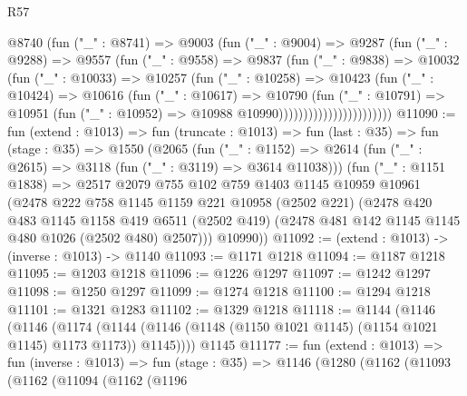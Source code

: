\begin{lexlean}{R57}
\begin{coremodule}
                          @8740
                            (fun ("_" : @8741) =>
                            @9003
                              (fun ("_" : @9004) =>
                              @9287
                                (fun ("_" : @9288) =>
                                @9557
                                  (fun ("_" : @9558) =>
                                  @9837
                                    (fun ("_" : @9838) =>
                                    @10032
                                      (fun ("_" : @10033) =>
                                      @10257
                                        (fun ("_" : @10258) =>
                                        @10423
                                          (fun ("_" : @10424) =>
                                          @10616
                                            (fun ("_" : @10617) =>
                                            @10790
                                              (fun ("_" : @10791) =>
                                              @10951
                                                (fun ("_" : @10952) =>
                                                @10988 @10990)))))))))))))))))))))))
@11090 := fun (extend : @1013) =>
  fun (truncate : @1013) =>
  fun (last : @35) =>
  fun (stage : @35) =>
  @1550
    (@2065
      (fun ("_" : @1152) => @2614 (fun ("_" : @2615) => @3118 (fun ("_" : @3119) => @3614 @11038)))
      (fun ("_" : @1151 @1838) =>
      @2517
        @2079
        @755
        @102
        @759
        @1403
        @1145
        @10959
        @10961
        (@2478
          @222
          @758
          @1145
          @1159
          @221
          @10958
          (@2502 @221)
          (@2478
            @420
            @483
            @1145
            @1158
            @419
            @6511
            (@2502 @419)
            (@2478 @481 @142 @1145 @1145 @480 @1026 (@2502 @480) @2507)))
        @10990))
@11092 := (extend : @1013) -> (inverse : @1013) -> @1140
@11093 := @1171 @1218
@11094 := @1187 @1218
@11095 := @1203 @1218
@11096 := @1226 @1297
@11097 := @1242 @1297
@11098 := @1250 @1297
@11099 := @1274 @1218
@11100 := @1294 @1218
@11101 := @1321 @1283
@11102 := @1329 @1218
@11118 := @1144
    (@1146
      (@1146
        (@1174 (@1144 (@1146 (@1148 (@1150 @1021 @1145) (@1154 @1021 @1145) @1173 @1173)) @1145))))
    @1145
@11177 := fun (extend : @1013) =>
  fun (inverse : @1013) =>
  fun (stage : @35) =>
  @1146
    (@1280
      (@1162
        (@11093
          (@1162
            (@11094
              (@1162
                (@1196

\end{coremodule}
\end{lexlean}

